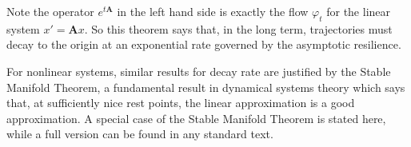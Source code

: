 
%	

Note the operator $e^{t\mathbf{A}}$ in the left hand side is exactly the flow $\varphi_t$ for the linear system $x' = \mathbf{A}x$. So this theorem says that, in the long term, trajectories must decay to the origin at an exponential rate governed by the asymptotic resilience. 

%



For nonlinear systems, similar results for decay rate are justified by the Stable Manifold Theorem, a fundamental result in dynamical systems theory which says that, at sufficiently nice rest points, the linear approximation is a good approximation. 
%
%
%
A special case of the Stable Manifold Theorem is stated here, while a full version can be found in any standard text. %

